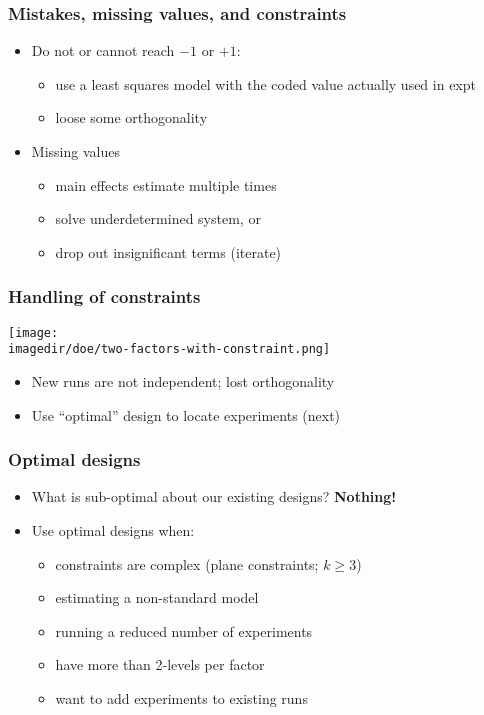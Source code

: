 \begin{frame}\frametitle{Mistakes, missing values, and constraints}
	\begin{itemize}
		\item	Do not or cannot reach $-1$ or $+1$:
		\begin{itemize}
			\item	use a least squares model with the coded value actually used in expt
			\item	loose some orthogonality
		\end{itemize}
	\end{itemize}
	\begin{itemize}
		\item	Missing values
		\begin{itemize}
			\item	main effects estimate multiple times
			\item	solve underdetermined system, or
			\item	drop out insignificant terms (iterate)
		\end{itemize}
	\end{itemize}
\end{frame}

\begin{frame}\frametitle{Handling of constraints}
	\begin{center}
		\texttt{[image: \\imagedir/doe/two-factors-with-constraint.png]}
	\end{center}
	\begin{itemize}
		\item	New runs are not independent; lost orthogonality
		\item	Use ``optimal'' design to locate experiments (next)
	\end{itemize}
\end{frame}

\begin{frame}\frametitle{Optimal designs}
	\begin{itemize}
		\item	What is sub-optimal about our existing designs? \textbf{Nothing!}
		\item	Use optimal designs when:
		\begin{itemize}
			\item	constraints are complex (plane constraints; $k \geq 3$)
			\item	estimating a non-standard model
			\item	running a reduced number of experiments
			\item	have more than 2-levels per factor
			\item	want to add experiments to existing runs
		\end{itemize}
	\end{itemize}
\end{frame}

